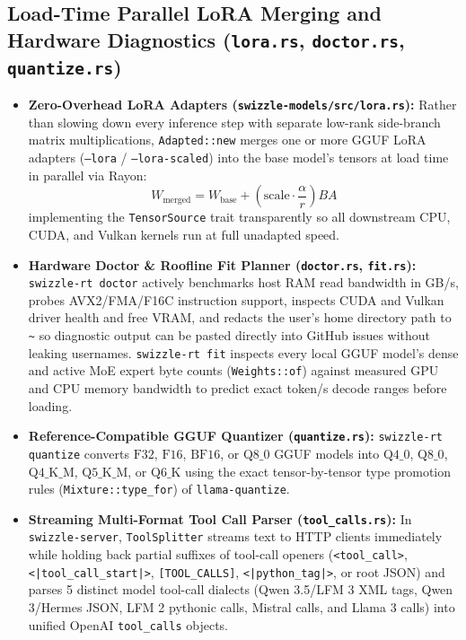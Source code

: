 \documentclass[10pt,a4paper]{article}
\theoremstyle{swzstyle}
\newcommand{\code}[1]{\texttt{#1}}
\begin{document}
\subsection{Load-Time Parallel LoRA Merging and Hardware Diagnostics (\texttt{lora.rs}, \texttt{doctor.rs}, \texttt{quantize.rs})}

\begin{itemize}
  \item \textbf{Zero-Overhead LoRA Adapters (\code{swizzle-models/src/lora.rs}):} Rather than slowing down every inference step with separate low-rank side-branch matrix multiplications, \code{Adapted::new} merges one or more GGUF LoRA adapters (\code{--lora} / \code{--lora-scaled}) into the base model's tensors at load time in parallel via Rayon:
  \begin{equation}
    W_{\text{merged}} = W_{\text{base}} + \left(\text{scale} \cdot \frac{\alpha}{r}\right) B A
  \end{equation}
  implementing the \code{TensorSource} trait transparently so all downstream CPU, CUDA, and Vulkan kernels run at full unadapted speed.
  \item \textbf{Hardware Doctor \& Roofline Fit Planner (\code{doctor.rs}, \code{fit.rs}):} \code{swizzle-rt doctor} actively benchmarks host RAM read bandwidth in GB/s, probes AVX2/FMA/F16C instruction support, inspects CUDA and Vulkan driver health and free VRAM, and redacts the user's home directory path to \code{\textasciitilde} so diagnostic output can be pasted directly into GitHub issues without leaking usernames. \code{swizzle-rt fit} inspects every local GGUF model's dense and active MoE expert byte counts (\code{Weights::of}) against measured GPU and CPU memory bandwidth to predict exact token/s decode ranges before loading.
  \item \textbf{Reference-Compatible GGUF Quantizer (\code{quantize.rs}):} \code{swizzle-rt quantize} converts $\text{F32}$, $\text{F16}$, $\text{BF16}$, or $\text{Q8\_0}$ GGUF models into $\text{Q4\_0}$, $\text{Q8\_0}$, $\text{Q4\_K\_M}$, $\text{Q5\_K\_M}$, or $\text{Q6\_K}$ using the exact tensor-by-tensor type promotion rules (\code{Mixture::type\_for}) of \code{llama-quantize}.
  \item \textbf{Streaming Multi-Format Tool Call Parser (\code{tool\_calls.rs}):} In \code{swizzle-server}, \code{ToolSplitter} streams text to HTTP clients immediately while holding back partial suffixes of tool-call openers (\code{<tool\_call>}, \code{<|tool\_call\_start|>}, \code{[TOOL\_CALLS]}, \code{<|python\_tag|>}, or root JSON) and parses 5 distinct model tool-call dialects (Qwen 3.5/LFM 3 XML tags, Qwen 3/Hermes JSON, LFM 2 pythonic calls, Mistral calls, and Llama 3 calls) into unified OpenAI \code{tool\_calls} objects.
\end{itemize}
\end{document}
